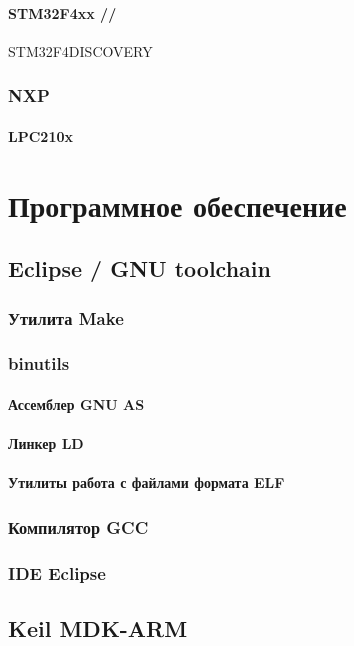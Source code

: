 \subsection{STM32F4xx //} STM32F4DISCOVERY



\section{NXP}
\subsection{LPC210x}

\part{Программное обеспечение}


\chapter{Eclipse / GNU toolchain}
\section{Утилита Make}
\section{binutils}
\subsection{Ассемблер GNU AS}
\subsection{Линкер LD}
\subsection{Утилиты работа с файлами формата ELF}
\section{Компилятор GCC}
\section{IDE Eclipse}
\chapter{Keil MDK-ARM}
